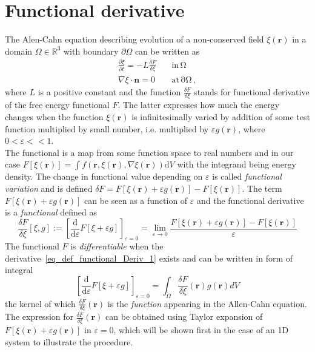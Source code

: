 \chapter{Functional derivative}
The Alen-Cahn equation describing evolution of a non-conserved field $\xi(\mathbf{r})$ in a domain $\Omega\in\mathbb{R}^3$ with boundary $\partial\Omega$ can be written as
\begin{align}
	\frac{\partial \xi}{\partial t} = -L\frac{\delta F}{\delta \xi} \quad &\mathrm{in \,\Omega}\\
	\nabla\xi\cdot\bm{n} = 0 \quad &\mathrm{at \, \partial\Omega}\,,
\end{align}
where $L$ is a positive constant and the function $\frac{\delta F}{\delta \xi}$ stands for functional derivative of the free energy functional $F$. The latter expresses how much the energy changes when the function $\xi(\mathbf{r})$ is infinitesimally varied by addition of some test function multiplied by small number, i.e. multiplied by $\varepsilon g(\mathbf{r})$, where $0<\varepsilon<<1$.\\
The functional is a map from some function space to real numbers and in our case $ F[\xi(\bm{r})] = \int f(\bm{r}, \xi(\bm{r}),\nabla\xi(\bm{r}))\mathrm{d}V $ with the integrand being energy density. The change in functional value depending on $\varepsilon$ is called \textit{functional variation} and is defined $\delta F = F[\xi(\mathbf{r})+\varepsilon g(\mathbf{r})]-F[\xi(\mathbf{r})]$. The term $F[\xi(\mathbf{r})+\varepsilon g(\mathbf{r})]$ can be seen as a function of $\varepsilon$ and the functional derivative is a \textit{functional} defined as 
\begin{equation} \label{eq_def_functional_Deriv_1}
	\frac{\delta F}{\delta \xi}[\xi,g] := \left[ \dfrac{\mathrm{d}}{\mathrm{d}\varepsilon}F[\xi + \varepsilon g] \right]_{\varepsilon=0} = \lim_{\varepsilon\rightarrow0} \frac{F[\xi(\mathbf{r})+\varepsilon g(\mathbf{r})] - F[\xi(\mathbf{r})]}{\varepsilon}  
\end{equation}
The functional $F$ is \textit{differentiable} when the derivative~\ref{eq_def_functional_Deriv_1} exists and can be written in form of integral
\begin{equation}\label{eq_def_functional_Deriv_2}
	\left[ \dfrac{\mathrm{d}}{\mathrm{d}\varepsilon}F[\xi + \varepsilon g] \right]_{\varepsilon=0} = \int_\Omega \frac{\delta F}{\delta \xi}(\mathbf{r})g(\mathbf{r})dV
\end{equation}
the kernel of which $\frac{\delta F}{\delta \xi}(\mathbf{r})$ is the \textit{function} appearing in the Allen-Cahn equation. The expression for $\frac{\delta F}{\delta \xi}(\mathbf{r})$ can be obtained using Taylor expansion of $F[\xi(\mathbf{r})+\varepsilon g(\mathbf{r})]$ in $\varepsilon=0$, which will be shown first in the case of an 1D system to illustrate the procedure. \\
